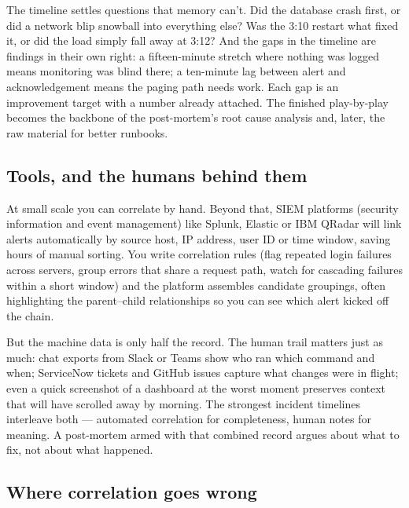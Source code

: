 The timeline settles questions that memory can't. Did the database crash first, or did a network blip snowball into everything else? Was the 3:10 restart what fixed it, or did the load simply fall away at 3:12? And the gaps in the timeline are findings in their own right: a fifteen-minute stretch where nothing was logged means monitoring was blind there; a ten-minute lag between alert and acknowledgement means the paging path needs work. Each gap is an improvement target with a number already attached. The finished play-by-play becomes the backbone of the post-mortem's root cause analysis and, later, the raw material for better runbooks.



\subsection{Tools, and the humans behind them}


At small scale you can correlate by hand. Beyond that, SIEM platforms (security information and event management) like Splunk, Elastic or IBM QRadar will link alerts automatically by source host, IP address, user ID or time window, saving hours of manual sorting. You write correlation rules (flag repeated login failures across servers, group errors that share a request path, watch for cascading failures within a short window) and the platform assembles candidate groupings, often highlighting the parent–child relationships so you can see which alert kicked off the chain.


But the machine data is only half the record. The human trail matters just as much: chat exports from Slack or Teams show who ran which command and when; ServiceNow tickets and GitHub issues capture what changes were in flight; even a quick screenshot of a dashboard at the worst moment preserves context that will have scrolled away by morning. The strongest incident timelines interleave both — automated correlation for completeness, human notes for meaning. A post-mortem armed with that combined record argues about what to fix, not about what happened.



\subsection{Where correlation goes wrong}


